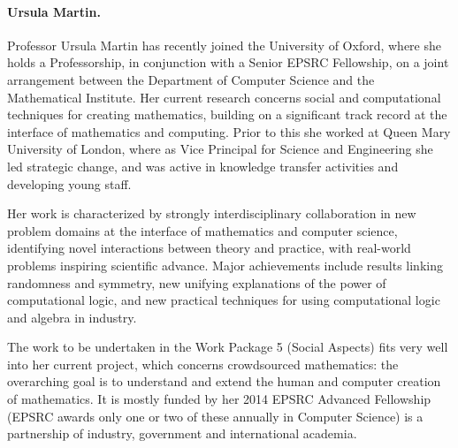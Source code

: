 \paragraph{Ursula Martin.}

%

%
Professor Ursula Martin has  recently joined the University of Oxford, where
she holds a Professorship, in conjunction with a Senior EPSRC Fellowship, on a
joint arrangement between  the Department of Computer Science and the
Mathematical Institute. Her current  research concerns social and computational
techniques for creating mathematics, building on a significant track record at
the interface of mathematics and computing. Prior to this she worked at  Queen
Mary University of London, where as Vice Principal for Science and Engineering
she led strategic change, and was active in knowledge transfer
activities and developing young staff. 

Her work is characterized by strongly interdisciplinary collaboration in new
problem domains at the interface of mathematics and computer science,
identifying novel interactions between theory and practice, with real-world
problems inspiring scientific advance. Major achievements include results
linking randomness and symmetry, new unifying explanations of the power of
computational logic, and new practical techniques for using computational logic
and algebra in industry.

The work to be undertaken in the Work Package 5 (Social Aspects) fits very well
into her current project, which concerns crowdsourced mathematics: the overarching goal is
to understand and extend the human and computer creation of mathematics. 
It is mostly funded by her
2014 EPSRC Advanced Fellowship (EPSRC awards only one or two of these annually
in Computer Science) is a partnership of industry, government and international
academia.  
